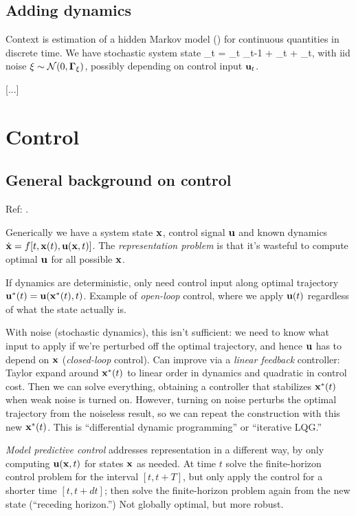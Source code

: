 \documentclass[notitlepage,openany,11pt]{report}
\theoremstyle{plain}%
\numberwithin{equation}{section}
\begin{document}
\subsection{Adding dynamics}

Context is estimation of a hidden Markov model () for continuous quantities in discrete time. We have stochastic system state 
\be
{}_{t} = _{t} _{t-1} +  _{t} + \xi_{t},
\ee
with iid noise $\xi \sim \mathcal{N}(0, \mathbf{\Gamma}_{\xi})$, possibly depending on control input $\mathbf{u}_{t}$.

[...]

\section{Control}

\subsection{General background on control}
Ref: \cite{KappenRuiz:16}.

Generically we have a system state $\mathbf{x}$, control signal $\mathbf{u}$ and known dynamics $\dot{\mathbf{x}} = f[t, \mathbf{x}(t), \mathbf{u}(\mathbf{x},t)]$. The \emph{representation problem} is that it's wasteful to compute optimal $\mathbf{u}$ for all possible $\mathbf{x}$.

If dynamics are deterministic, only need control input along optimal trajectory $\mathbf{u}^{\ast}(t) = \mathbf{u}(\mathbf{x}^{\ast}(t), t)$. Example of \emph{open-loop} control, where we apply $\mathbf{u}(t)$ regardless of what the state actually is. 

With noise (stochastic dynamics), this isn't sufficient: we need to know what input to apply if we're perturbed off the optimal trajectory, and hence $\mathbf{u}$ has to depend on $\mathbf{x}$ (\emph{closed-loop} control). Can improve via a \emph{linear feedback} controller: Taylor expand around $\mathbf{x}^{\ast}(t)$ to linear order in dynamics and quadratic in control cost. Then we can solve everything, obtaining a controller that stabilizes $\mathbf{x}^{\ast}(t)$ when weak noise is turned on. However, turning on noise perturbs the optimal trajectory from the noiseless result, so we can repeat the construction with this new $\mathbf{x}^{\ast}(t)$. This is ``differential dynamic programming'' or ``iterative LQG.''

\emph{Model predictive control} addresses representation in a different way, by only computing $\mathbf{u}(\mathbf{x},t)$ for states $\mathbf{x}$ as needed. At time $t$ solve the finite-horizon control problem for the interval  $[t, t+T]$, but only apply the control for a shorter time $[t, t+dt]$; then solve the finite-horizon problem again from the new state (``receding horizon.'') Not globally optimal, but more robust.
\end{document}
